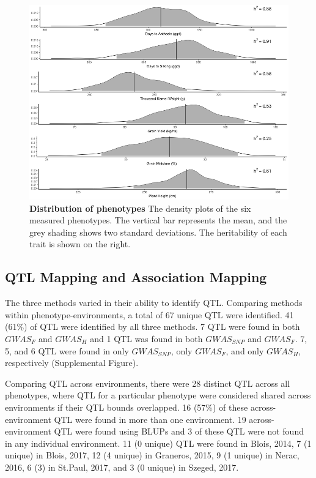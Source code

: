 \documentclass[article,9pt,twocolumn,twoside]{rilabRxiv}
\begin{document}
\begin{figure}[ht]
\centering
\includegraphics[width=\linewidth]{figures/Methods_Fig2.png}
\caption{\textbf{Distribution of phenotypes} The density plots of the six measured phenotypes. The vertical bar represents the mean, and the grey shading shows two standard deviations. The heritability of each trait is shown on the right.}
\label{fig:figure2}
\end{figure}

\subsection{QTL Mapping and Association Mapping}
The three methods varied in their ability to identify QTL.
Comparing methods within phenotype-environments, a total of 67 unique QTL were identified. 41 (61\%) of QTL were identified by all three methods. 7 QTL were found in both $GWAS_F$ and $GWAS_H$ and 1 QTL was found in both $GWAS_{SNP}$ and $GWAS_F$. 7, 5, and 6 QTL were found in only $GWAS_{SNP}$, only $GWAS_F$, and only $GWAS_H$, respectively (Supplemental Figure).

Comparing QTL across environments, there were 28 distinct QTL across all phenotypes, where QTL for a particular phenotype were considered shared across environments if their QTL bounds overlapped. 16 (57\%) of these across-environment QTL were found in more than one environment. 19 across-environment QTL were found using BLUPs and 3 of these QTL were not found in any individual environment. 11 (0 unique) QTL were found in Blois, 2014, 7 (1 unique) in Blois, 2017, 12 (4 unique) in Graneros, 2015, 9 (1 unique) in Nerac, 2016, 6 (3) in St.Paul, 2017, and 3 (0 unique) in Szeged, 2017. 
\end{document}
